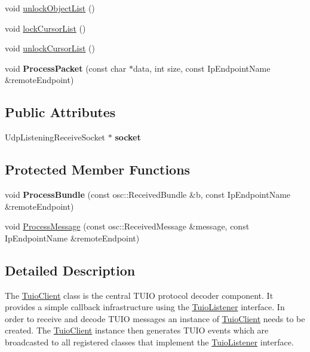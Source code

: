 \begin{DoxyCompactItemize}
\item 
void \hyperlink{class_t_u_i_o_1_1_tuio_client_aaa87c7597c0527c25b34c92945b19b21}{unlock\+Object\+List} ()
\item 
void \hyperlink{class_t_u_i_o_1_1_tuio_client_a1b7325f668a1bf9e8edab35141050daa}{lock\+Cursor\+List} ()
\item 
void \hyperlink{class_t_u_i_o_1_1_tuio_client_a3b87ab82c8249cb994577864b6ff8044}{unlock\+Cursor\+List} ()
\item 
\mbox{\label{class_t_u_i_o_1_1_tuio_client_a5ea8bdfa403bf0c479ca2950e0b44e17}} 
void {\bfseries Process\+Packet} (const char $\ast$data, int size, const Ip\+Endpoint\+Name \&remote\+Endpoint)
\end{DoxyCompactItemize}
\subsection*{Public Attributes}
\begin{DoxyCompactItemize}
\item 
\mbox{\label{class_t_u_i_o_1_1_tuio_client_aff887f941e11a8f574f6bf10eb83d2bc}} 
Udp\+Listening\+Receive\+Socket $\ast$ {\bfseries socket}
\end{DoxyCompactItemize}
\subsection*{Protected Member Functions}
\begin{DoxyCompactItemize}
\item 
\mbox{\label{class_t_u_i_o_1_1_tuio_client_a823280d95c9ff39c7e9033eea8839c6a}} 
void {\bfseries Process\+Bundle} (const osc\+::\+Received\+Bundle \&b, const Ip\+Endpoint\+Name \&remote\+Endpoint)
\item 
void \hyperlink{class_t_u_i_o_1_1_tuio_client_adac258ff4e62e178dc2f5a89f0965d73}{Process\+Message} (const osc\+::\+Received\+Message \&message, const Ip\+Endpoint\+Name \&remote\+Endpoint)
\end{DoxyCompactItemize}


\subsection{Detailed Description}
The \hyperlink{class_t_u_i_o_1_1_tuio_client}{Tuio\+Client} class is the central T\+U\+IO protocol decoder component. It provides a simple callback infrastructure using the \hyperlink{class_t_u_i_o_1_1_tuio_listener}{Tuio\+Listener} interface. In order to receive and decode T\+U\+IO messages an instance of \hyperlink{class_t_u_i_o_1_1_tuio_client}{Tuio\+Client} needs to be created. The \hyperlink{class_t_u_i_o_1_1_tuio_client}{Tuio\+Client} instance then generates T\+U\+IO events which are broadcasted to all registered classes that implement the \hyperlink{class_t_u_i_o_1_1_tuio_listener}{Tuio\+Listener} interface.

